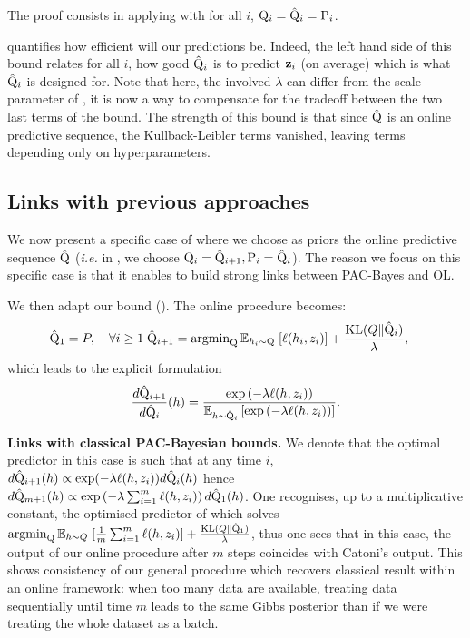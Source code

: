 The proof consists in applying  with for all $i$, $\mathrm{Q}_{i}= \hat{\mathrm{Q}}_{i}= \mathrm{P}_{i}$.

 quantifies how efficient will our predictions be. Indeed, the left hand side of this bound relates for all $i$, how good $\hat{\mathrm{Q}}_i$ is to predict $\mathbf{z}_i$ (on average) which is what $\hat{\mathrm{Q}}_i$ is designed for.
Note that here, the involved $\lambda$ can differ from the scale parameter of , it is now a way to compensate for the tradeoff between the two last terms of the bound. The strength of this bound is that since $\hat{\mathrm{Q}}$ is an online predictive sequence, the Kullback-Leibler terms vanished, leaving terms depending only on hyperparameters.


\subsection*{Links with previous approaches}

We now present a specific case of  where we choose as priors the online predictive sequence $\hat{\mathrm{Q}}$ (\emph{i.e.} in , we choose $\mathrm{Q}_{i}=\hat{\mathrm{Q}}_{i+1}, \mathrm{P}_{i}= \hat{\mathrm{Q}}_i$). The reason we focus on this specific case is that it enables to build strong links between PAC-Bayes and OL.

We then adapt our \OPBTrain bound (). The online procedure becomes:
\begin{align}
  \label{eq: pacb_online_alg_specific_case}
  \hat{\mathrm{Q}}_1= P, \quad \forall i\geq1\; \hat{\mathrm{Q}}_{i+1}&= \operatorname{argmin}_{\mathrm{Q}} \mathbb{E}_{h_i\sim \mathrm{Q}} \; [\ell(h_i,z_i)] + \frac{\operatorname{KL}(Q\| \hat{\mathrm{Q}}_{i})}{\lambda},
\end{align}
which leads to the explicit formulation
\begin{align*}
  \frac{d\hat{\mathrm{Q}}_{i+1}}{d\hat{\mathrm{Q}}_{i}}(h) = \frac{\exp\left(-\lambda \ell(h,z_i)\right)}{\mathbb{E}_{h\sim \hat{\mathrm{Q}}_{i}}\left[\exp\left(-\lambda \ell(h,z_i)\right)\right]}.
\end{align*}

\textbf{Links with classical PAC-Bayesian bounds.} We denote that the optimal predictor in this case is such that at any time $i$, $d\hat{\mathrm{Q}}_{i+1}(h) \propto \exp(-\lambda\ell(h,z_i))d\hat{\mathrm{Q}}_i(h) $ hence $d\hat{\mathrm{Q}}_{m+1}(h) \propto \exp\left(-\lambda\sum_{i=1}^m\ell(h,z_i)\right)d\hat{\mathrm{Q}}_1(h) $.
One recognises, up to a multiplicative constant, the optimised predictor of \citet[][Th 1.2.6]{catoni2007pac} which solves
$\operatorname{argmin}_{\mathrm{Q}} \mathbb{E}_{h\sim Q} \; [\frac{1}{m}\sum_{i=1}^m\ell(h,z_i)] + \frac{\operatorname{KL}(Q\| \hat{\mathrm{Q}}_{1})}{\lambda}$, thus one sees that in this case, the output of our online procedure after $m$ steps coincides with Catoni's output. This shows consistency of our general procedure which recovers classical result within an online framework: when too many data are available, treating data sequentially until time $m$ leads to the same Gibbs posterior than if we were treating the whole dataset as a batch.


